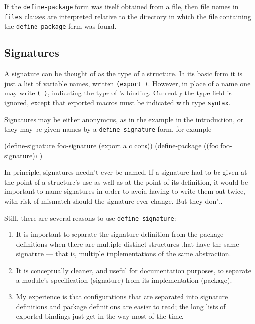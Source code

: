 If the {\tt define-package} form was itself obtained from a file, then
file names in {\tt files} clauses are interpreted relative to the
directory in which the file containing the {\tt define-package} form
was found.


\subsection*{Signatures}

A signature can be thought of as the type of a structure.  In its
basic form it is just a list of variable names, written {\tt(export
 \etc)}.  However, in place of
a name one may write {\tt( )}, indicating the type
of 's binding.  Currently the type field is ignored, except
that exported macros must be indicated with type {\tt syntax}.

Signatures may be either anonymous, as in the example in the
introduction, or they may be given names by a {\tt define-signature}
form, for example
\begin{code}
    (define-signature foo-signature (export a c cons))
    (define-package ((foo foo-signature)) \etc)
\end{code}
In principle, signatures needn't ever be named.  If a signature
had to be given at the point of a structure's use as well as at the
point of its definition, it would be important to name signatures in
order to avoid having to write them out twice, with risk of mismatch
should the signature ever change.  But they don't.

Still, there are several reasons to use {\tt define-signature}:
\begin{enumerate}
\item It is important to separate the signature definition from the
package definitions when there are multiple distinct structures that
have the same signature --- that is, multiple implementations of the
same abstraction.

\item It is conceptually cleaner, and useful for documentation
purposes, to separate a module's specification (signature) from its
implementation (package).

\item My experience is that configurations that are separated into
signature definitions and package definitions are easier to read; the
long lists of exported bindings just get in the way most of the time.
\end{enumerate}

